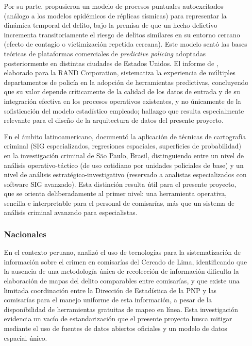 \documentclass[12pt,letterpaper]{report}
\begin{document}
Por su parte, \citet{mohler2011selfexciting} propusieron un modelo de procesos puntuales autoexcitados (an\'alogo a los modelos epid\'emicos de r\'eplicas s\'ismicas) para representar la din\'amica temporal del delito, bajo la premisa de que un hecho delictivo incrementa transitoriamente el riesgo de delitos similares en su entorno cercano (efecto de contagio o victimizaci\'on repetida cercana). Este modelo sent\'o las bases te\'oricas de plataformas comerciales de \textit{predictive policing} adoptadas posteriormente en distintas ciudades de Estados Unidos. El informe de \citet{perry2013predictive}, elaborado para la RAND Corporation, sistematiza la experiencia de m\'ultiples departamentos de polic\'ia en la adopci\'on de herramientas predictivas, concluyendo que su valor depende cr\'iticamente de la calidad de los datos de entrada y de su integraci\'on efectiva en los procesos operativos existentes, y no \'unicamente de la sofisticaci\'on del modelo estad\'istico empleado; hallazgo que resulta especialmente relevante para el dise\~no de la arquitectura de datos del presente proyecto.

En el \'ambito latinoamericano, \citet{kahn2019cartografia} document\'o la aplicaci\'on de t\'ecnicas de cartograf\'ia criminal (SIG especializados, regresiones espaciales, superficies de probabilidad) en la investigaci\'on criminal de S\~ao Paulo, Brasil, distinguiendo entre un nivel de an\'alisis operativo-t\'actico (de uso cotidiano por unidades policiales de base) y un nivel de an\'alisis estrat\'egico-investigativo (reservado a analistas especializados con software SIG avanzado). Esta distinci\'on resulta \'util para el presente proyecto, que se orienta deliberadamente al primer nivel: una herramienta operativa, sencilla e interpretable para el personal de comisar\'ias, m\'as que un sistema de an\'alisis criminal avanzado para especialistas.

\subsubsection{Nacionales}

En el contexto peruano, \citet{mora2015sistematizacion} analiz\'o el uso de tecnolog\'ias para la sistematizaci\'on de informaci\'on sobre el crimen en comisar\'ias del Cercado de Lima, identificando que la ausencia de una metodolog\'ia \'unica de recolecci\'on de informaci\'on dificulta la elaboraci\'on de mapas del delito comparables entre comisar\'ias, y que existe una limitada coordinaci\'on entre la Direcci\'on de Estad\'istica de la PNP y las comisar\'ias para el manejo uniforme de esta informaci\'on, a pesar de la disponibilidad de herramientas gratuitas de mapeo en l\'inea. Esta investigaci\'on evidencia un vac\'io de estandarizaci\'on que el presente proyecto busca mitigar mediante el uso de fuentes de datos abiertos oficiales y un modelo de datos espacial \'unico.
\end{document}
